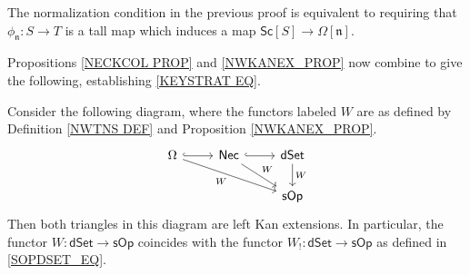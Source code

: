 \documentclass{hha}
\theoremstyle{definition} %
\begin{document}
\begin{remark}
	The normalization condition in the previous proof
	is equivalent to requiring that 
	$\phi_{\mathfrak{n}} \colon S \to T$
	is a tall map which induces a map
	$\mathsf{Sc}[S] \to \Omega[\mathfrak{n}]$.
\end{remark}



Propositions \ref{NECKCOL PROP} and 
\ref{NWKANEX_PROP}
now combine to give the following, establishing \eqref{KEYSTRAT EQ}.


\begin{theorem}[{cf. \cite[Thm. 1.3]{DS11}}]
	\label{KANEXTCHAR THM}
	Consider the following diagram,
	where the functors labeled $W$ 
	are as defined by Definition \ref{NWTNS DEF}
	and Proposition \ref{NWKANEX_PROP}.
\begin{equation}
\begin{tikzcd}
	\Omega \ar[hookrightarrow]{r}
	\ar{rrd}[swap]{W} 
&
	\mathsf{Nec}
	\ar[hookrightarrow]{r}
	\ar{rd}{W}
&
	\mathsf{dSet}
	\ar{d}{W}
\\
&&
	\mathsf{sOp} 
\end{tikzcd}
\end{equation}
Then both triangles in this diagram are left Kan extensions.
%
In particular, the functor
$W \colon \mathsf{dSet} \to \mathsf{sOp}$
coincides with the functor
$W_! \colon \mathsf{dSet} \to \mathsf{sOp}$
as defined in \eqref{SOPDSET_EQ}.
\end{theorem}
\end{document}
